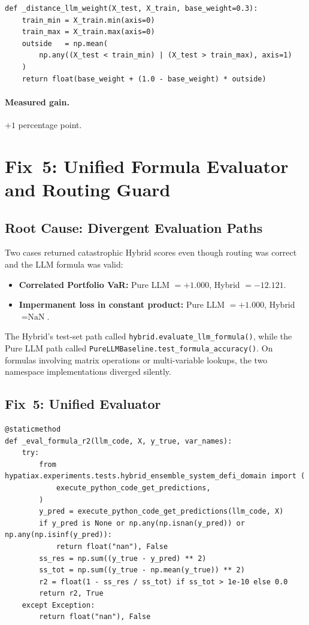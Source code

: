 \documentclass[11pt,a4paper]{article}
\begin{document}
\begin{lstlisting}[caption={Distance-gated blend weight.}]
def _distance_llm_weight(X_test, X_train, base_weight=0.3):
    train_min = X_train.min(axis=0)
    train_max = X_train.max(axis=0)
    outside   = np.mean(
        np.any((X_test < train_min) | (X_test > train_max), axis=1)
    )
    return float(base_weight + (1.0 - base_weight) * outside)
\end{lstlisting}

\paragraph{Measured gain.} $+1$ percentage point.

\section{Fix~5: Unified Formula Evaluator and Routing Guard}
\label{sec:fix5}

\subsection{Root Cause: Divergent Evaluation Paths}

Two cases returned catastrophic Hybrid scores even though routing was correct
and the LLM formula was valid:

\begin{itemize}[leftmargin=*]
  \item \textbf{Correlated Portfolio VaR:} Pure LLM $= +1.000$,
    Hybrid $= -12.121$.
  \item \textbf{Impermanent loss in constant product:} Pure LLM $= +1.000$,
    Hybrid $= \text{NaN}$.
\end{itemize}

The Hybrid's test-set path called \texttt{hybrid.evaluate\_llm\_formula()},
while the Pure LLM path called
\texttt{PureLLMBaseline.test\_formula\_accuracy()}.  On formulas involving
matrix operations or multi-variable lookups, the two namespace implementations
diverged silently.

\subsection{Fix~5: Unified Evaluator}

\begin{lstlisting}[caption={Unified formula evaluator (Fix~5).}]
@staticmethod
def _eval_formula_r2(llm_code, X, y_true, var_names):
    try:
        from hypatiax.experiments.tests.hybrid_ensemble_system_defi_domain import (
            execute_python_code_get_predictions,
        )
        y_pred = execute_python_code_get_predictions(llm_code, X)
        if y_pred is None or np.any(np.isnan(y_pred)) or np.any(np.isinf(y_pred)):
            return float("nan"), False
        ss_res = np.sum((y_true - y_pred) ** 2)
        ss_tot = np.sum((y_true - np.mean(y_true)) ** 2)
        r2 = float(1 - ss_res / ss_tot) if ss_tot > 1e-10 else 0.0
        return r2, True
    except Exception:
        return float("nan"), False
\end{lstlisting}
\end{document}
